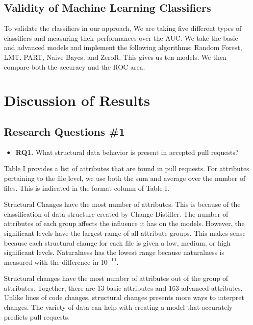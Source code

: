 \documentclass[10pt, conference]{IEEEtran}
\begin{document}
\subsection{Validity of Machine Learning Classifiers}
To validate the classifiers in our approach, We are taking five different types of classifiers and measuring their performances over the AUC. We take the basic and advanced models and implement the following algorithms: Random Forest, LMT, PART, Naive Bayes, and ZeroR. This gives us ten models. We then compare both the accuracy and the ROC area.

\section{Discussion of Results}
\label{discussion}
\subsection{Research Questions \#1}
\begin{mdframed} 
\begin{itemize}
\item \textbf{RQ1.} What structural data behavior is present in accepted pull requests?
\end{itemize}
\end{mdframed}
Table I provides a list of attributes that are found in pull requests. For attributes pertaining to the file level, we use both the sum and average over the number of files. This is indicated in the format column of Table I.

Structural Changes have the most number of attributes. This is because of the classification of data structure created by Change Distiller. The number of attributes of each group affects the influence it has on the models. However, the significant levels have the largest range of all attribute groups. This makes sense because each structural change for each file is given a low, medium, or high significant levels. Naturalness has the lowest range because naturalness is measured with the difference in $10^{-10}$.

Structural changes have the most number of attributes out of the group of attributes. Together, there are 13 basic attributes and 163 advanced attributes. Unlike lines of code changes, structural changes presents more ways to interpret changes. The variety of data can help with creating a model that accurately predicts pull requests.
\end{document}
